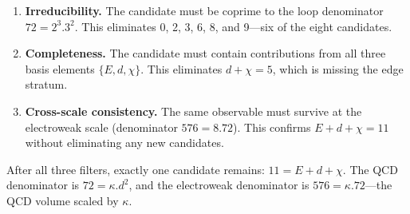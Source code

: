 \documentclass[11pt,a4paper]{book}
\def\cdot{.}%
\begin{document}
\begin{enumerate}
\item \textbf{Irreducibility.} The candidate must be coprime to the loop denominator $72 = 2^3 \cdot 3^2$. This eliminates 0, 2, 3, 6, 8, and 9---six of the eight candidates.

\item \textbf{Completeness.} The candidate must contain contributions from all three basis elements $\{E, d, \chi\}$. This eliminates $d + \chi = 5$, which is missing the edge stratum.

\item \textbf{Cross-scale consistency.} The same observable must survive at the electroweak scale (denominator $576 = 8 \cdot 72$). This confirms $E + d + \chi = 11$ without eliminating any new candidates.
\end{enumerate}

After all three filters, exactly one candidate remains: $11 = E + d + \chi$. The QCD denominator is $72 = \kappa \cdot d^2$, and the electroweak denominator is $576 = \kappa \cdot 72$---the QCD volume scaled by $\kappa$.
\end{document}
